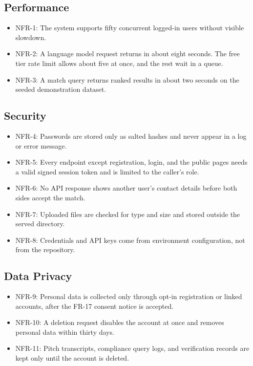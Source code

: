 \documentclass{FastFyp}
\begin{document}
\subsection{Performance}
\begin{itemize}
    \item NFR-1: The system supports fifty concurrent logged-in users without visible slowdown.
    \item NFR-2: A language model request returns in about eight seconds. The free tier rate limit allows about five at once, and the rest wait in a queue.
    \item NFR-3: A match query returns ranked results in about two seconds on the seeded demonstration dataset.
\end{itemize}

\subsection{Security}
\begin{itemize}
    \item NFR-4: Passwords are stored only as salted hashes and never appear in a log or error message.
    \item NFR-5: Every endpoint except registration, login, and the public pages needs a valid signed session token and is limited to the caller's role.
    \item NFR-6: No API response shows another user's contact details before both sides accept the match.
    \item NFR-7: Uploaded files are checked for type and size and stored outside the served directory.
    \item NFR-8: Credentials and API keys come from environment configuration, not from the repository.
\end{itemize}

\subsection{Data Privacy}
\begin{itemize}
    \item NFR-9: Personal data is collected only through opt-in registration or linked accounts, after the FR-17 consent notice is accepted.
    \item NFR-10: A deletion request disables the account at once and removes personal data within thirty days.
    \item NFR-11: Pitch transcripts, compliance query logs, and verification records are kept only until the account is deleted.
\end{itemize}
\end{document}
